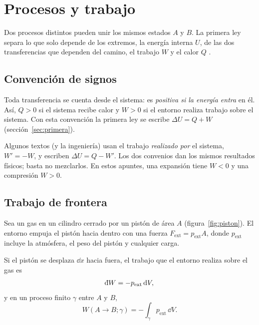 \section{Procesos y trabajo}
Dos procesos distintos pueden unir los mismos estados $A$ y $B$. La primera ley separa lo que solo
depende de los extremos, la energía interna $U$, de las dos transferencias que dependen del camino, el
trabajo $W$ y el calor $Q$ \cite{gonzalez1,gonzalez2}.

\subsection{Convención de signos}

\begin{definicion}
Toda transferencia se cuenta desde el sistema: es \emph{positiva si la energía entra} en él. Así,
$Q>0$ si el sistema recibe calor y $W>0$ si el entorno realiza trabajo sobre el sistema. Con esta
convención la primera ley se escribe $\Delta U=Q+W$ (sección~\ref{sec:primera}).
\end{definicion}

\begin{observacion}
Algunos textos (y la ingeniería) usan el trabajo \emph{realizado por} el sistema, $W'=-W$, y escriben
$\Delta U=Q-W'$. Los dos convenios dan los mismos resultados físicos; basta no mezclarlos. En estos
apuntes, una expansión tiene $W<0$ y una compresión $W>0$.
\end{observacion}

\subsection{Trabajo de frontera}

Sea un gas en un cilindro cerrado por un pistón de área $A$ (figura~\ref{fig:piston}). El entorno
empuja el pistón hacia dentro con una fuerza $F_{\mathrm{ext}}=p_{\mathrm{ext}}A$, donde $p_{\mathrm{ext}}$
incluye la atmósfera, el peso del pistón y cualquier carga.

\begin{proposicion}
Si el pistón se desplaza $\dd x$ hacia fuera, el trabajo que el entorno realiza sobre el gas es
\begin{equation}\label{eq:dW}
  \dbar W=-p_{\mathrm{ext}}\,\dd V,
\end{equation}
y en un proceso finito $\gamma$ entre $A$ y $B$,
\begin{equation}\label{eq:W}
  W(A\to B;\gamma)=-\int_{\gamma}p_{\mathrm{ext}}\,\dd V .
\end{equation}
\end{proposicion}

